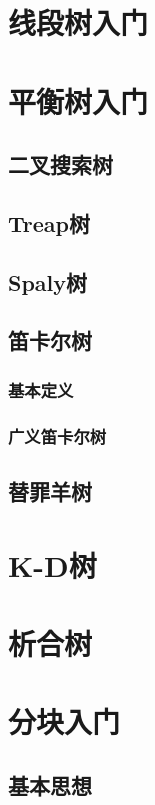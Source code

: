 \documentclass[12pt,a4paper]{article}
\begin{document}
\newpage
\section{线段树入门} %

\newpage
\section{平衡树入门}
\subsection{二叉搜索树}
\subsection{Treap树}
\subsection{Spaly树}
\subsection{笛卡尔树}
\subsubsection{基本定义}
\subsubsection{广义笛卡尔树}
\subsection{替罪羊树}

\newpage
\section{K-D树}

\newpage
\section{析合树}

\newpage
\section{分块入门}
\subsection{基本思想}
\end{document}
